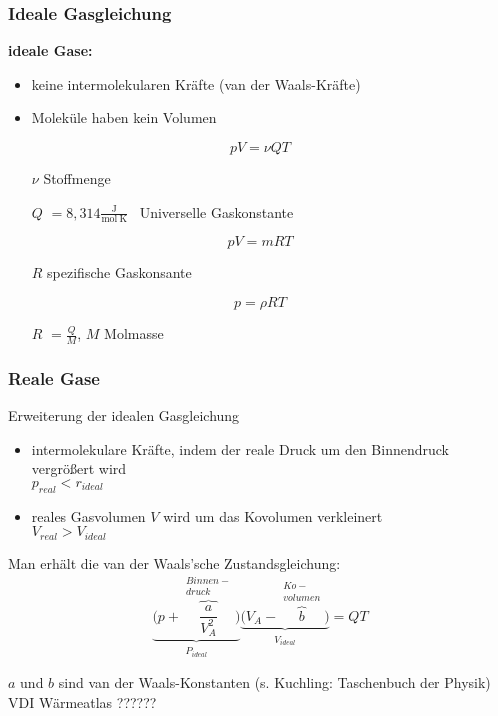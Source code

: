 \documentclass[10pt,a4paper]{article}
\begin{document}
\subsubsection{Ideale Gasgleichung}

\textbf{ideale Gase:}
\begin{itemize}
\item keine intermolekularen Kräfte (van der Waals-Kräfte)
\item Moleküle haben kein Volumen
\end{itemize}

\[p V = \nu Q T\]

\begin{itemize}
\item[$\nu$] Stoffmenge
\item[$Q$] $= 8,314 \frac{\text{J}}{\text{mol}~\text{K}}$ ~Universelle Gaskonstante
\end{itemize}

\[p V = m R T\]
\begin{itemize}
\item[$R$] spezifische Gaskonsante
\end{itemize}

\[p = \rho R T\]
\begin{itemize}
\item[$R$] $= \frac{Q}{M}$, $M$ Molmasse
\end{itemize}

\subsubsection{Reale Gase}

Erweiterung der idealen Gasgleichung
\begin{itemize}
\item intermolekulare Kräfte, indem der reale Druck um den Binnendruck vergrößert wird \\
$p_{real} < r_{ideal}$
\item reales Gasvolumen $V$ wird um das Kovolumen verkleinert \\
$V_{real} > V_{ideal}$
\end{itemize}
Man erhält die van der Waals'sche Zustandsgleichung:
\[
\underbrace{\Big( p + \overbrace{\frac{a}{V_A^2}}^{\substack{Binnen-\\druck}} \Big)}_{\substack{P_{ideal}}} \underbrace{\big( V_A - \overbrace{b}^{\substack{Ko-\\volumen}} \big)}_{\substack{V_{ideal}}} = QT
\]

$a$ und $b$ sind van der Waals-Konstanten (s. Kuchling: Taschenbuch der Physik) VDI Wärmeatlas ??????
\end{document}
